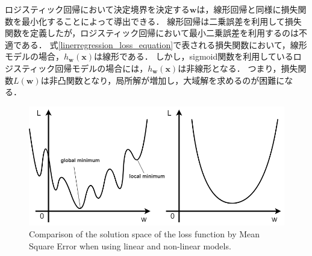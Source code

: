     ロジスティック回帰において決定境界を決定する$\bm{w}$は，線形回帰と同様に損失関数を最小化することによって導出できる．
    線形回帰は二乗誤差を利用して損失関数を定義したが，ロジスティック回帰において最小二乗誤差を利用するのは不適である．
    式\ref{linerregression_loss_equation}で表される損失関数において，線形モデルの場合，$h_{\bm{w}}(\bm{x})$は線形である．
    しかし，sigmoid関数を利用しているロジスティック回帰モデルの場合には，$h_{\bm{w}}(\bm{x})$は非線形となる．
    つまり，損失関数$L(\bm{w})$は非凸関数となり，局所解が増加し，大域解を求めるのが困難になる．
    \begin{figure}[ht]
        \begin{center}
            \includegraphics[width=12.0cm]{./8_appendix/img/global_minimum}
            \caption{Comparison of the solution space of the loss function by Mean Square Error when using linear and non-linear models.}
            \label{2_global_minimum}
        \end{center}
    \end{figure}
    
